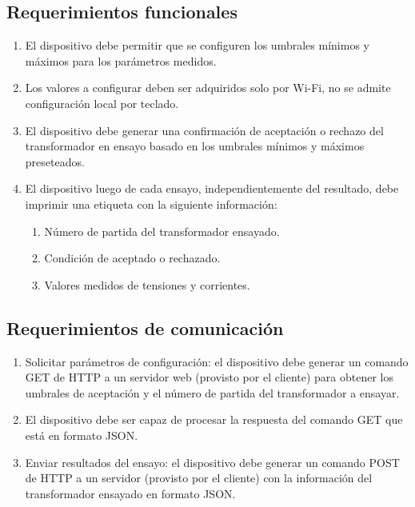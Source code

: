 \subsection{Requerimientos funcionales}
\label{subsec:ReqFun}
	\begin{enumerate}
	\item El dispositivo debe permitir que se configuren los umbrales mínimos y máximos para los parámetros medidos. 
	\item Los valores a configurar deben ser adquiridos solo por Wi-Fi, no se admite configuración local por teclado.
	\item El dispositivo debe generar una confirmación de aceptación o rechazo del transformador en ensayo basado en los umbrales mínimos y máximos preseteados.
	\item El dispositivo luego de cada ensayo, independientemente del resultado, debe imprimir una etiqueta con la siguiente información:
		\begin{enumerate}
		\item Número de partida del transformador ensayado.
		\item Condición de aceptado o rechazado.
		\item Valores medidos de tensiones y corrientes.
		\end{enumerate}
	\end{enumerate}	
\subsection{Requerimientos de comunicación}
\label{subsec:ReqCom}
	\begin{enumerate}
	\item Solicitar parámetros de configuración: el dispositivo debe generar un comando GET de HTTP a un servidor web (provisto por el cliente) para obtener los umbrales de aceptación y el número de partida del transformador a ensayar.
	\item El dispositivo debe ser capaz de procesar la respuesta del comando GET que está en formato JSON.
	\item Enviar resultados del ensayo: el dispositivo debe generar un comando POST de HTTP a un servidor (provisto por el cliente) con la información del transformador ensayado en formato JSON.
	\end{enumerate}
